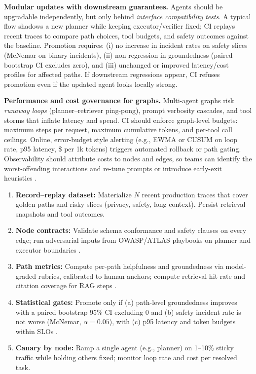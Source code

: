\noindent\textbf{Modular updates with downstream guarantees.}
Agents should be upgradable independently, but only behind \emph{interface compatibility tests}. A typical flow shadows a new planner while keeping executor/verifier fixed; CI replays recent traces to compare path choices, tool budgets, and safety outcomes against the baseline. Promotion requires: (i) no increase in incident rates on safety slices (McNemar on binary incidents), (ii) non-regression in groundedness (paired bootstrap CI excludes zero), and (iii) unchanged or improved latency/cost profiles for affected paths. If downstream regressions appear, CI refuses promotion even if the updated agent looks locally strong.

\noindent\textbf{Performance and cost governance for graphs.}
Multi-agent graphs risk \emph{runaway loops} (planner--retriever ping-pong), prompt verbosity cascades, and tool storms that inflate latency and spend. CI should enforce graph-level budgets: maximum steps per request, maximum cumulative tokens, and per-tool call ceilings. Online, error-budget style alerting (e.g., EWMA or CUSUM on loop rate, p95 latency, \$ per 1k tokens) triggers automated rollback or path gating. Observability should attribute costs to nodes and edges, so teams can identify the worst-offending interactions and re-tune prompts or introduce early-exit heuristics \cite{mlflow_llm_eval}.

\begin{tcolorbox}[
  title={\textbf{A Graph-Aware Gating Recipe (Worked Example)}},
  colback=cyan!5,
  colframe=cyan!40!black,
  colbacktitle=cyan!20,
  coltitle=black,
  fonttitle=\bfseries,
  boxrule=0.7pt,
  arc=4pt,
  left=5mm, right=5mm, top=4mm, bottom=4mm,
  before skip=6pt,
  after skip=6pt
]
\begin{enumerate}[leftmargin=1.5em, itemsep=4pt, topsep=2pt, label=(\roman*)]
\item \textbf{Record--replay dataset:} Materialize $N$ recent production traces that cover golden paths and risky slices (privacy, safety, long-context). Persist retrieval snapshots and tool outcomes.  
\item \textbf{Node contracts:} Validate schema conformance and safety clauses on every edge; run adversarial inputs from OWASP/ATLAS playbooks on planner and executor boundaries \cite{owasp_llm}.  
\item \textbf{Path metrics:} Compute per-path helpfulness and groundedness via model-graded rubrics, calibrated to human anchors; compute retrieval hit rate and citation coverage for RAG steps \cite{trulens,phoenix_rag,ragas_eacl2024}.  
\item \textbf{Statistical gates:} Promote only if (a) path-level groundedness improves with a paired bootstrap 95\% CI excluding 0 and (b) safety incident rate is not worse (McNemar, $\alpha=0.05$), with (c) p95 latency and token budgets within SLOs \cite{koehn2004,mcnemar1947}.  
\item \textbf{Canary by node:} Ramp a single agent (e.g., planner) on 1--10\% sticky traffic while holding others fixed; monitor loop rate and cost per resolved task.  
\end{enumerate}
\end{tcolorbox}

